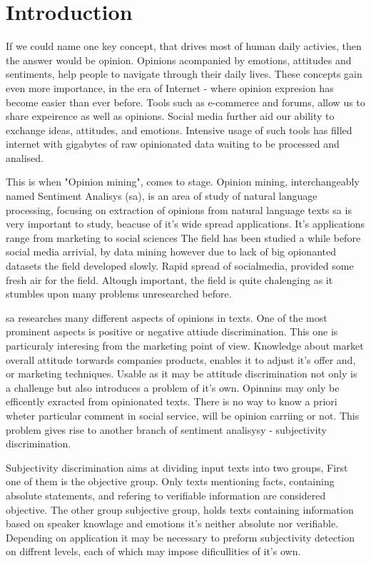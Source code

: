 \chapter{Introduction}

If we could name one key concept, that drives most of human daily activies, then the answer would be opinion. 
Opinions acompanied by emotions, attitudes and sentiments, help people to navigate through their daily lives.
These concepts gain even more importance, in the era of Internet - where opinion expresion has become easier 
than ever before. Tools such as e-commerce and forums, allow us to share expeirence as well as opinions. 
Social media further aid our ability to exchange ideas, attitudes, and emotions. Intensive usage of such tools 
has filled internet with gigabytes of raw opinionated data waiting to be processed and analised.

This is when "Opinion mining", comes to stage. Opinion mining, interchangeably named Sentiment Analisys (\ac{sa}),
 is an area of study of natural language processing, focusing on extraction of opinions from natural language texts
\ac{sa} is very important to study, beacuse of it's wide spread applications. It's applications range
from marketing to social sciences The field has been studied a while before social media arrivial, by data mining
however due to lack of big opionanted datasets the field developed slowly. Rapid spread of socialmedia, provided some
fresh air for the field. Altough important, the field is quite chalenging as it stumbles upon many problems unresearched before.

\ac{sa} researches many different aspects of opinions in texts. One of the most prominent aspects is
positive or negative attiude discrimination. This one is particuraly interesing from the marketing point of view. 
Knowledge about market overall attitude torwards companies products, enables it to adjust it's offer and, or marketing techniques.
Usable as it may be attitude discrimination not only is a challenge but also introduces a problem of it's own. 
Opinnins may only be efficently exracted from opinionated texts. There is no way to know a priori wheter particular comment 
in social service, will be opinion carriing or not. This problem gives rise to another branch of 
sentiment analisysy  - subjectivity discrimination.

Subjectivity discrimination aims at dividing input texts into two groups, First one of them is the objective group. 
Only texts mentioning facts, containing absolute statements, and refering to verifiable information are considered objective. 
The other group  subjective group, holds texts containing information based on speaker knowlage and emotions 
it's neither absolute nor verifiable. Depending on application it may be necessary to preform subjectivity detection on diffrent
levels, each of which may impose dificullities of it's own.  

